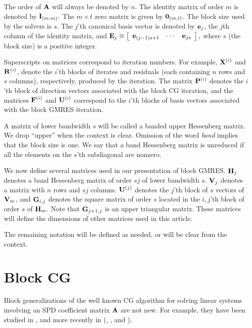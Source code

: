 \documentclass[twoside]{siamltex}
\newcommand{\bA}{{\bf A}}
\newcommand{\bE}{{\bf E}}
\newcommand{\bF}{{\bf F}}
\newcommand{\bG}{{\bf G}}
\newcommand{\bH}{{\bf H}}
\newcommand{\bV}{{\bf V}}
\newcommand{\bP}{{\bf P}}
\newcommand{\bU}{{\bf U}}
\newcommand{\bR}{{\bf R}}
\newcommand{\bX}{{\bf X}}
\newcommand{\be}{{\bf e}}
\begin{document}
The order of $\bA$ will always be denoted by $n.$ The identity
matrix of order $m$ is denoted by ${\bf I}_{(m,m)}.$ The $m \times
t$ zero matrix is given by ${\bf 0}_{(m,t)}$. The block size used
by the solvers is $s$. The $j$'th canonical basis vector is
denoted by ${\bf e}_j$, the $j$th column of the identity matrix,
and
 $\bE_j \equiv \left[\begin{array}{ccc}
                    \be_{(j-1)s+1} & \cdots & \be_{js}
                   \end{array}\right] ,$
where $s$ (the block size) is a positive integer.

Superscripts on matrices correspond to iteration numbers. For
example, $\bX^{(i)}$ and $\bR^{(i)}$, denote the $i$'th blocks of
iterates and residuals (each containing $n$ rows and $s$ columns),
respectively, produced by the iteration. The matrix $\bP^{(i)}$
denotes the $i$'th block of direction vectors associated with the
block CG iteration, and the matrices $\bF^{(i)}$ and $\bU^{(i)}$
correspond to the $i$'th blocks of basis vectors associated with
the block GMRES iteration.

A matrix of lower bandwidth $s$ will be called a banded upper
Hessenberg matrix.  We drop ``upper'' when the context is clear.
Omission of the word {\em band} implies that the block size is
one. We say that a band Hessenberg matrix is unreduced if all the
elements on the $s$'th subdiagonal are nonzero.

We now define several matrices used in our presentation of block
GMRES. $\bH_j$ denotes a band Hessenberg matrix of order $sj$ of
lower bandwidth $s$. $\bV_j$ denotes a matrix with $n$ rows and
$sj$ columns. $\bU^{(j)}$ denotes the $j$'th block of $s$ vectors
of $\bV_m$, and $\bG_{i,j}$ denotes the square matrix of order $s$
located in the $i,j$'th block of order $s$ of $\bH_m.$ Note that
$\bG_{j+1,j}$ is an upper triangular matrix. These matrices will
define the dimensions of other matrices used in this article.

The remaining notation will be defined as needed, or will be clear
from the context.


\section{Block CG}
\label{sec:blkcg}

Block generalizations of the well known CG algorithm \cite{HS52}
for solving linear systems involving an SPD coefficient matrix
$\bA$ are not new. For example, they have been studied in
\cite{Ol80}, and more recently in (\cite{FOP95}, \cite{NY95}, and
\cite{DUB01}).
\end{document}
